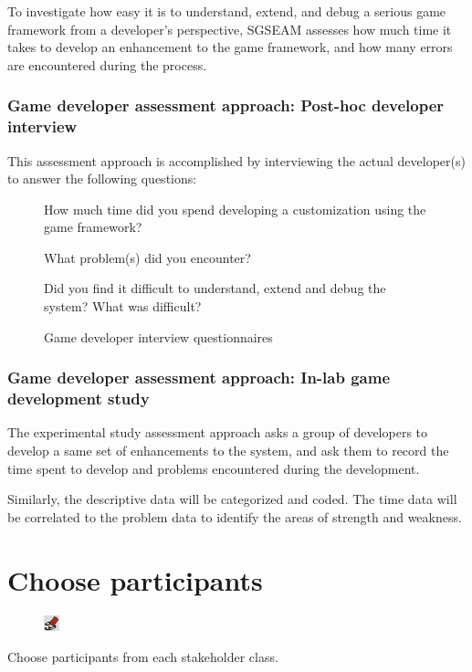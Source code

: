 \documentclass[11pt,oneside]{book}
\begin{document}
To investigate how easy it is to understand, extend, and debug a serious game
framework from a developer's perspective, SGSEAM assesses how much time it takes to develop an
enhancement to the game framework, and how many errors are encountered
during the process.

\subsubsection{Game developer assessment approach: Post-hoc developer interview}
\label{Post-hoc game developer interview}

This assessment approach is accomplished by interviewing the actual developer(s) to
answer the following questions:\\
 
\begin{figure}[ht!]
\begin{mybox}
\begin{compactenum}
\item How much time did you spend developing a customization using the game framework?
\item What problem(s) did you encounter?
\item Did you find it difficult to understand, extend and debug the system? What was difficult?\\
\end{compactenum}
\end{mybox}
\caption{Game developer interview questionnaires}
\label{fig:game-developer-interview}  
\end{figure}

\subsubsection{Game developer assessment approach: In-lab game development study}
\label{In-lab game development study}

The experimental study assessment approach asks a group of developers to develop a same set of
enhancements to the system, and ask them to record the time spent to develop and problems
encountered during the development.

Similarly, the descriptive data will be categorized and coded. The time data will be correlated to the problem data to identify the areas of strength and weakness.

\section {Choose participants}
\begin{shadebox}
\begin{figure}
\vspace{-15pt}\hspace{-10pt}
    \includegraphics[width=0.04\textwidth]{note-icon}
\end{figure}
Choose participants from each stakeholder class.
\end{shadebox}
\end{document}
